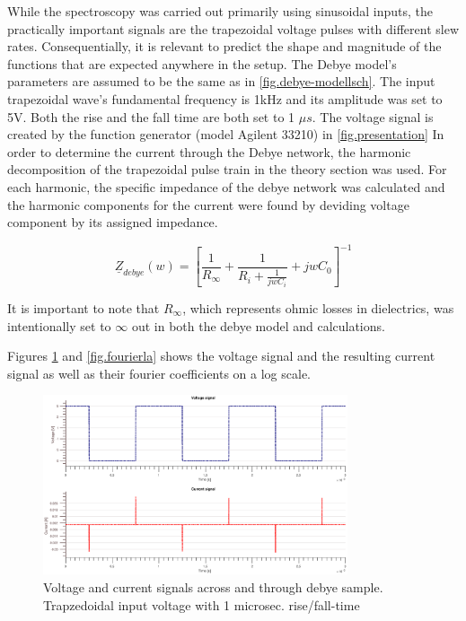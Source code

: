 While the spectroscopy was carried out primarily using sinusoidal inputs,
the practically important signals are the trapezoidal voltage pulses with different
slew rates. Consequentially, it is relevant to predict the shape and magnitude
of the functions that are expected anywhere in the setup. 
The Debye model's parameters are assumed to be the same as in \ref{fig.debye-modellsch}.
The input trapezoidal wave's fundamental frequency is 1kHz and its amplitude was
set to 5V. Both the rise and 
the fall time are both set to 1 $\mu s$. The voltage signal is created
by the function generator (model Agilent 33210) in \ref{fig.presentation}
\newline
In order to determine the current through the Debye network, the harmonic decomposition of
the trapezoidal pulse train in the theory section was used. For each harmonic, the specific
impedance of the debye network was calculated and the harmonic components for the current were found by deviding voltage component by its assigned impedance.

\begin{equation}
 \underline{Z}_{debye}(w)=\left[\frac{1}{R_{\infty}}+\frac{1}{R_{i}+\frac{1}{jwC_{i}}}+jwC_{0}\right]^{-1}
 \label{debyeimpedance}
\end{equation}

It is important to note that $R_{\infty}$, which represents
ohmic losses in dielectrics, was intentionally set to $\infty$ out in both the debye model and calculations.

Figures \ref{fig.beforeandafter} and \ref{fig.fourierla} shows the voltage signal and the resulting current signal as well as their fourier coefficients on a log scale.

\begin{figure}[h!tb]
\centerline{\includegraphics[width=0.8\textwidth]{figures/Method/signal_simulation/beforeandafter.eps}}
\caption{Voltage and current signals across and through debye sample. Trapzedoidal input voltage with 1 microsec. rise/fall-time}
\label{fig.beforeandafter}
\end{figure}

